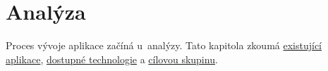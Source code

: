 \chapter{Analýza}
\label{ch:analysis}
Proces vývoje aplikace začíná u~analýzy. Tato kapitola zkoumá \hyperref[sc:existing_apps]{existující aplikace}, \hyperref[sc:available_technologies]{dostupné technologie} a \hyperref[sc:target_audience]{cílovou skupinu}.






